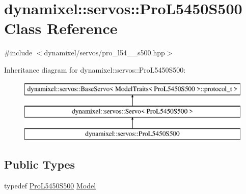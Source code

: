 \hypertarget{classdynamixel_1_1servos_1_1_pro_l5450_s500}{}\section{dynamixel\+:\+:servos\+:\+:Pro\+L5450\+S500 Class Reference}
\label{classdynamixel_1_1servos_1_1_pro_l5450_s500}


{\ttfamily \#include $<$dynamixel/servos/pro\+\_\+l54\+\_\+\_\+s500.\+hpp$>$}

Inheritance diagram for dynamixel\+:\+:servos\+:\+:Pro\+L5450\+S500\+:\begin{figure}[H]
\begin{center}
\leavevmode
\includegraphics[height=3.000000cm]{classdynamixel_1_1servos_1_1_pro_l5450_s500}
\end{center}
\end{figure}
\subsection*{Public Types}
\begin{DoxyCompactItemize}
\item 
typedef \hyperlink{classdynamixel_1_1servos_1_1_pro_l5450_s500}{Pro\+L5450\+S500} \hyperlink{classdynamixel_1_1servos_1_1_pro_l5450_s500_ab11c58f304bcb8859df1302bda41c727}{Model}
\end{DoxyCompactItemize}
